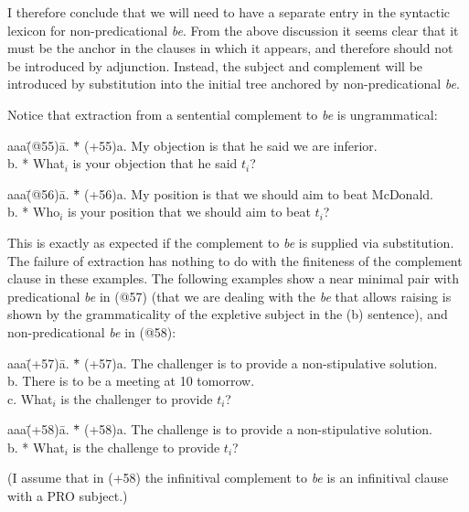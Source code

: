 I therefore conclude that we will need to have a separate entry in the
syntactic lexicon for non-predicational {\em be}. From the above
discussion it seems clear that it must be the anchor in the clauses in
which it appears, and therefore should not be introduced by adjunction.
Instead, the subject and complement will be introduced by substitution
into the initial tree anchored by non-predicational {\em be\/}.

Notice that extraction from a sentential complement to {\em be} is
ungrammatical: 
\begin{tabbing}
aaa\=(@55)\=a. \= *\= \kill
   \>(+55)\>a. \>  \> My objection is that he said we are inferior. \\
   \>     \>b. \> *\> What$_{i}$ is your objection that he said $t_{i}$?   
\end{tabbing}
\begin{tabbing}
aaa\=(@56)\=a. \= *\= \kill
   \>(+56)\>a. \>  \> My position is that we should aim to beat McDonald. \\
   \>     \>b. \> *\> Who$_{i}$ is your position that we should aim to
                      beat $t_{i}$?
\end{tabbing}
This is exactly as expected if the complement to {\em be} is supplied via
substitution.  The failure of extraction has nothing to do with the
finiteness of the complement clause in these examples.  The following
examples show a near minimal pair with predicational {\em be} in (@57)
(that we are dealing with the {\em be\/} that allows raising is shown by
the grammaticality of the expletive subject in the (b) sentence), and
non-predicational {\em be\/} in (@58):
\begin{tabbing}
aaa\=(+57)\=a. \= *\= \kill
   \>(+57)\>a. \>  \> The challenger is to provide a non-stipulative 
                      solution.\\
   \>     \>b. \>  \> There is to be a meeting at 10 tomorrow. \\
   \>     \>c. \>  \> What$_{i}$ is the challenger to provide $t_{i}$?
\end{tabbing}
\begin{tabbing}
aaa\=(+58)\=a. \= *\= \kill
   \>(+58)\>a. \>  \> The challenge is to provide a non-stipulative
                      solution.       \\
   \>     \>b. \> *\> What$_{i}$ is the challenge to provide $t_{i}$?
\end{tabbing}
(I assume that in (+58) the infinitival complement to {\em be} is an
infinitival clause with a PRO subject.)

